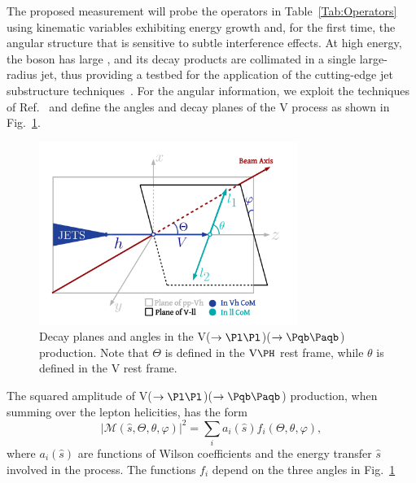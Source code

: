 \documentclass[a4paper,11pt]{article}
\newcommand{\Pb}{{{\Pqb}}\xspace}
\newcommand{\PAb}{{{{\Paqb}}}\xspace}
\renewcommand{\PV}{{{{V}}}\xspace}
\newcommand{\VH}{{{\PV}{\PH}}\xspace}
\begin{document}
The proposed measurement will probe the operators in Table~\ref{Tab:Operators} 
using kinematic variables exhibiting energy growth and, for the first time, the angular structure that is sensitive to subtle interference effects.
At high energy, the \PH boson has large \pt, and its decay products are collimated in a single large-radius jet, thus providing a testbed for the application of the cutting-edge jet substructure techniques~\cite{Qu:2019gqs,Sirunyan:2020lcu}.
For the angular information, we exploit the techniques of Ref.~\cite{Banerjee:2019twi} and define the angles and decay planes of the \VH process as shown in Fig.~\ref{fig:HelicityFrame}.

\begin{figure}[hbtp]
\begin{center}
\includegraphics[width=0.75\textwidth]{Figures/LHE/TheThreeAnglesVh.pdf}
\end{center}
\caption{
Decay planes and angles in the \PV($\rightarrow \textrm{\Pl} \textrm{\Pl}$)\PH($\rightarrow \Pb \PAb$) production. Note that $\Theta$ is defined in the $\textrm{\PV}\PH$ rest frame, while $\theta$ is defined in the \PV rest frame.
}
\label{fig:HelicityFrame}
\end{figure}

The squared amplitude of \PV($\to \Pl \Pl$)\PH($\to \Pb \PAb$) production, when summing over the lepton helicities, has the form
\begin{equation}
	|\mathcal{M} \left(\hat{s}, \Theta, \theta, \varphi \right)|^{2} = {\sum}_{i} a_i \left(\hat{s}\right) f_i \left(\Theta, \theta, \varphi \right),
\label{Eq:Amplitude}
\end{equation}
where $a_i\left(\hat{s}\right)$ are functions of Wilson coefficients and the energy transfer $\hat{s}$ involved in the process.
The functions $f_i$ depend on the three angles in Fig.~\ref{fig:HelicityFrame}
\end{document}
